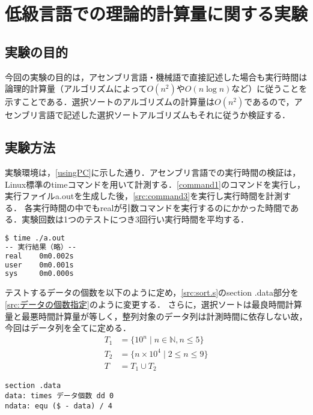 \chapter{低級言語での理論的計算量に関する実験}
\section{実験の目的}
今回の実験の目的は，アセンブリ言語・機械語で直接記述した場合も実行時間は論理的計算量（アルゴリズムによって\(O(n^2)\)や\(O(n\log n)\)など）に従うことを示すことである．選択ソートのアルゴリズムの計算量は\(O(n^2)\)である\cite[p.50,51]{アルゴリズムとデータ構造}ので，アセンブリ言語で記述した選択ソートアルゴリズムもそれに従うか検証する．
\section{実験方法}
実験環境は，\ref{usingPC}に示した通り．アセンブリ言語での実行時間の検証は，Linux標準の{\ttfamily time}コマンドを用いて計測する．\ref{command1}のコマンドを実行し，実行ファイル{\ttfamily a.out}を生成した後，\ref{src:command3}を実行し実行時間を計測する．
各実行時間の中でも{\ttfamily real}が引数コマンドを実行するのにかかった時間である．実験回数は1つのテストにつき3回行い実行時間を平均する．
\begin{lstlisting}[language={Bash},caption={実行コマンド},label={src:command3},frame={single},numbers={none}]
$ time ./a.out
-- 実行結果（略）--
real    0m0.002s
user    0m0.001s
sys     0m0.000s
\end{lstlisting}
テストするデータの個数を以下のように定め，\ref{src:sort.s}の{\ttfamily section .data}部分を\ref{src:データの個数指定}のように変更する．
さらに，選択ソートは最良時間計算量と最悪時間計算量が等しく\cite[p.50]{アルゴリズムとデータ構造}，整列対象のデータ列は計測時間に依存しない故，今回はデータ列を全て{}に定める．
\begin{align*}
    T_1 & =\{10^n\mid n\in\mathbb{N}, n\leq 5\} \\
    T_2 & =\{n\times 10^4\mid 2\leq n\leq 9\}   \\
    T   & =T_1\cup T_2\tag*{(データ数)}
\end{align*}
\begin{lstlisting}[caption={データの個数指定}, label={src:データの個数指定},frame={single},numbers={none}]
    section .data
data: times データ個数 dd 0
ndata: equ ($ - data) / 4
\end{lstlisting}
